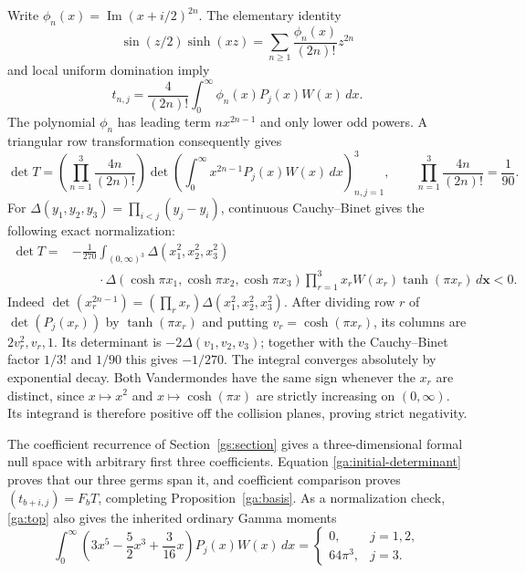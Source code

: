 Write $\phi_n(x)=\operatorname{Im}(x+i/2)^{2n}$.  The elementary
identity
\[
 \sin(z/2)\sinh(xz)=\sum_{n\ge1}\frac{\phi_n(x)}{(2n)!}z^{2n}
\]
and local uniform domination imply
\[
               t_{n,j}=\frac4{(2n)!}
                   \int_0^\infty\phi_n(x)P_j(x)W(x)\,dx.
\]
The polynomial $\phi_n$ has leading term $nx^{2n-1}$ and only
lower odd powers.  A triangular row transformation consequently gives
\[
 \det T=\left(\prod_{n=1}^3\frac{4n}{(2n)!}\right)
   \det\left(\int_0^\infty x^{2n-1}P_j(x)W(x)\,dx\right)_{n,j=1}^3,
 \qquad\prod_{n=1}^3\frac{4n}{(2n)!}=\frac1{90}.
\]
For $\Delta(y_1,y_2,y_3)=\prod_{i<j}(y_j-y_i)$,
continuous Cauchy--Binet gives the following exact normalization:
\begin{equation}\label{ga:initial-determinant}
 \boxed{\begin{aligned}
 \det T={}&-\frac1{270}\int_{(0,\infty)^3}
       \Delta(x_1^2,x_2^2,x_3^2)\\
 &\qquad\cdot\Delta(\cosh\pi x_1,\cosh\pi x_2,\cosh\pi x_3)
       \prod_{r=1}^3x_rW(x_r)\tanh(\pi x_r)\,d\boldsymbol{x}<0.
 \end{aligned}}
\end{equation}
Indeed $\det(x_r^{2n-1})=(\prod_rx_r)\Delta(x_1^2,x_2^2,x_3^2)$.
After dividing row $r$ of $\det(P_j(x_r))$ by
$\tanh(\pi x_r)$ and putting $v_r=\cosh(\pi x_r)$, its
columns are $2v_r^2,v_r,1$.  Its determinant is
$-2\Delta(v_1,v_2,v_3)$; together with the Cauchy--Binet factor
$1/3!$ and $1/90$ this gives $-1/270$.
The integral converges absolutely by exponential decay.  Both
Vandermondes have the same sign whenever the $x_r$ are distinct,
since $x\mapsto x^2$ and $x\mapsto\cosh(\pi x)$ are strictly
increasing on $(0,\infty)$.  Its integrand is therefore positive
off the collision planes, proving strict negativity.

The coefficient recurrence of Section~\ref{gs:section} gives a
three-dimensional formal null space with arbitrary first three
coefficients.  Equation \eqref{ga:initial-determinant} proves that
our three germs span it, and coefficient comparison proves
$(t_{b+i,j})=F_bT$, completing Proposition~\ref{ga:basis}.
As a normalization check, \eqref{ga:top} also gives the inherited
ordinary Gamma moments
\[
 \int_0^\infty\left(3x^5-\frac52x^3+\frac3{16}x\right)
                 P_j(x)W(x)\,dx
 =\begin{cases}0,&j=1,2,\\64\pi^3,&j=3.\end{cases}
\]
